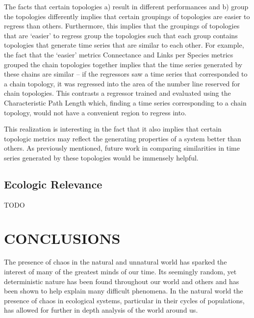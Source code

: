 \documentclass[letterpaper, 10 pt, conference]{ieeeconf}  %
\begin{document}
    The facts that certain topologies a) result in different performances and b) group the topologies differently implies that certain groupings of topologies are easier to regress than others. Furthermore, this implies that the groupings of topologies that are ‘easier’ to regress group the topologies such that each group contains topologies that generate time series that are similar to each other. For example, the fact that the ‘easier’ metrics Connectance and Links per Species metrics grouped the chain topologies together implies that the time series generated by these chains are similar – if the regressors saw a time series that corresponded to a chain topology, it was regressed into the area of the number line reserved for chain topologies. This contrasts a regressor trained and evaluated using the Characteristic Path Length which, finding a time series corresponding to a chain topology, would not have a convenient region to regress into. 

    This realization is interesting in the fact that it also implies that certain topologic metrics may reflect the generating properties of a system better than others. As previously mentioned, future work in comparing similarities in time series generated by these topologies would be immensely helpful.

\subsection{Ecologic Relevance}

    TODO
    

\section{CONCLUSIONS}
	The presence of chaos in the natural and unnatural world has sparked the interest of many of the greatest minds of our time. Its seemingly random, yet deterministic nature has been found throughout our world and others and has been shown to help explain many difficult phenomena. In the natural world the presence of chaos in ecological systems, particular in their cycles of populations, has allowed for further in depth analysis of the world around us. 
\end{document}
